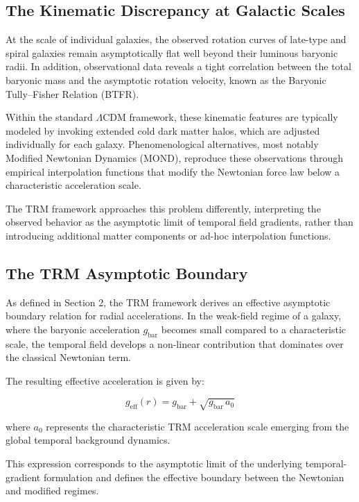\documentclass[11pt]{article}
\begin{document}
	\subsection{The Kinematic Discrepancy at Galactic Scales}

	At the scale of individual galaxies, the observed rotation curves of late-type and spiral galaxies remain asymptotically flat well beyond their luminous baryonic radii. In addition, observational data reveals a tight correlation between the total baryonic mass and the asymptotic rotation velocity, known as the Baryonic Tully--Fisher Relation (BTFR).

	Within the standard $\Lambda$CDM framework, these kinematic features are typically modeled by invoking extended cold dark matter halos, which are adjusted individually for each galaxy. Phenomenological alternatives, most notably Modified Newtonian Dynamics (MOND), reproduce these observations through empirical interpolation functions that modify the Newtonian force law below a characteristic acceleration scale.

	The TRM framework approaches this problem differently, interpreting the observed behavior as the asymptotic limit of temporal field gradients, rather than introducing additional matter components or ad-hoc interpolation functions.

	\subsection{The TRM Asymptotic Boundary}

	As defined in Section 2, the TRM framework derives an effective asymptotic boundary relation for radial accelerations. In the weak-field regime of a galaxy, where the baryonic acceleration $g_{\mathrm{bar}}$ becomes small compared to a characteristic scale, the temporal field develops a non-linear contribution that dominates over the classical Newtonian term.

	The resulting effective acceleration is given by:

	\begin{equation}
		g_{\mathrm{eff}}(r) = g_{\mathrm{bar}} + \sqrt{g_{\mathrm{bar}}\, a_0}
	\end{equation}

	where $a_0$ represents the characteristic TRM acceleration scale emerging from the global temporal background dynamics.

	This expression corresponds to the asymptotic limit of the underlying temporal-gradient formulation and defines the effective boundary between the Newtonian and modified regimes.
\end{document}
